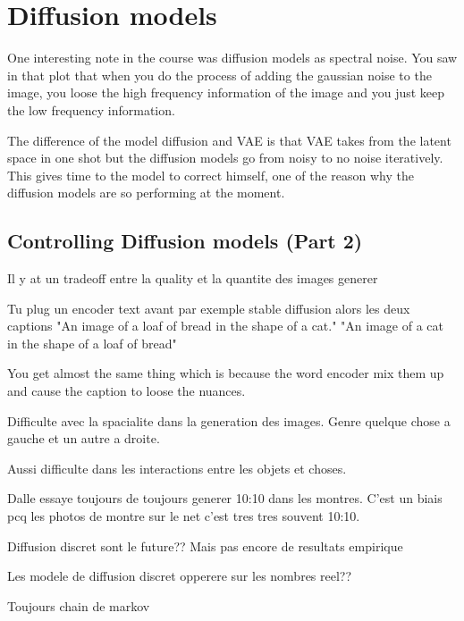 \documentclass{article}
\begin{document}
\clearpage\newpage

\section{Diffusion models} \label{sec:diffusion}


One interesting note in the course was diffusion models as spectral noise. You saw in that plot that when you do the process of adding the gaussian noise to the image, you loose the high frequency information of the image and you just keep the low frequency information.

The difference of the model diffusion and VAE is that VAE takes from the latent space in one shot but the diffusion models go from noisy to no noise iteratively. This gives time to the model to correct himself, one of the reason why the diffusion models are so performing at the moment.

\subsection{Controlling Diffusion models (Part 2)}

Il y at un tradeoff entre la quality et la quantite des images generer

Tu plug un encoder text avant par exemple stable diffusion alors les deux captions
"An image of a loaf of bread in the shape of a cat."
"An image of a cat in the shape of a loaf of bread"

You get almost the same thing which is because the word encoder mix them up and cause the caption to loose the nuances.

Difficulte avec la spacialite dans la generation des images. Genre quelque chose a gauche et un autre a droite.

Aussi difficulte dans les interactions entre les objets et choses.

Dalle essaye toujours de toujours generer 10:10 dans les montres. C'est un biais pcq les photos de montre sur le net c'est tres tres souvent 10:10.

Diffusion discret sont le future?? Mais pas encore de resultats empirique

Les modele de diffusion discret opperere sur les nombres reel??

Toujours chain de markov
\end{document}
